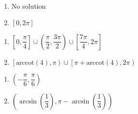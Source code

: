 \documentclass{ximera}
\begin{document}
\begin{multicols}{2}

\begin{enumerate}

\setcounter{enumi}{\value{HW}}

\item No solution
\item $[0, 2\pi]$

\setcounter{HW}{\value{enumi}}

\end{enumerate}

\end{multicols}

\begin{multicols}{2}

\begin{enumerate}

\setcounter{enumi}{\value{HW}}

\item  $\left[0, \dfrac{\pi}{4} \right] \cup \left(\dfrac{\pi}{2}, \dfrac{3\pi}{2}\right) \cup \left[\dfrac{7\pi}{4}, 2\pi\right]$
\item  $\left[\text{arccot}(4), \pi \right) \cup \left[ \pi + \text{arccot}(4), 2\pi\right)$ 

\setcounter{HW}{\value{enumi}}

\end{enumerate}

\end{multicols}

\begin{multicols}{2}

\begin{enumerate}

\setcounter{enumi}{\value{HW}}

\item $\left( -\dfrac{\pi}{6}, \dfrac{\pi}{6} \right)$ 
\item  $\left( \arcsin\left(\dfrac{1}{3}\right), \pi - \arcsin\left(\dfrac{1}{3}\right) \right)$ 

\setcounter{HW}{\value{enumi}}

\end{enumerate}

\end{multicols}
\end{document}
